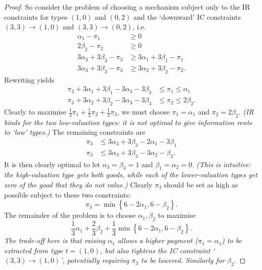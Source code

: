 \begin{proof}
	So consider the problem of choosing a mechanism subject only to the IR constraints for types $(1,0)$ and $(0,2)$
	and the `downward' IC constraints $(3,3) \to (1,0)$ and $(3,3) \to (0,2)$, i.e.
	\begin{align*}
		\alpha_1 - \pi_1
		&\geq 0 \\
		2 \beta_2 - \pi_2
		&\geq 0 \\
		3 \alpha_3 + 3 \beta_3 - \pi_3
		&\geq 3 \alpha_1 + 3 \beta_1 - \pi_1 \\
		3 \alpha_3 + 3 \beta_3 - \pi_3
		&\geq 3 \alpha_2 + 3 \beta_2 - \pi_2 .
	\end{align*}
	Rewriting yields
	\begin{align*}
		\pi_3 + 3 \alpha_1 + 3 \beta_1 - 3 \alpha_3 - 3 \beta_3
		&\leq \pi_1
		\leq \alpha_1
		\\
		\pi_3 + 3 \alpha_2 + 3 \beta_2 - 3 \alpha_3 - 3 \beta_3
		&\leq \pi_2
		\leq 2 \beta_2 .
	\end{align*}
	Clearly to maximise $\frac{1}{3}\pi_1 + \frac{1}{3}\pi_2 + \frac{1}{3}\pi_3$,
	we must choose $\pi_1 = \alpha_1$ and $\pi_2 = 2 \beta_2$.
	\emph{(IR binds for the two low-valuation types: it is not optimal to give information rents to `low' types.)}
	The remaining constraints are
	\begin{align*}
		\pi_3
		&\leq 3 \alpha_3 + 3 \beta_3 - 2 \alpha_1 - 3 \beta_1
		\\
		\pi_3
		&\leq 3 \alpha_3 + 3 \beta_3 - 3 \alpha_2 - \beta_2 .
	\end{align*}
	It is then clearly optimal to let $\alpha_3 = \beta_3 = 1$ and $\beta_1 = \alpha_2 = 0$.
	\emph{(This is intuitive: the high-valuation type gets both goods, while each of the lower-valuation types get zero of the good that they do not value.)}
	Clearly $\pi_3$ should be set as high as possible subject to these two constraints:
	\begin{equation*}
		\pi_3 = \min\left\{ 6 - 2 \alpha_1, 6 - \beta_2 \right\} .
	\end{equation*}
	The remainder of the problem is to choose $\alpha_1,\beta_2$ to maximise
	\begin{equation*}
		\frac{1}{3}\alpha_1 + \frac{2}{3}\beta_2
		+ \frac{1}{3}\min\left\{ 6 - 2 \alpha_1, 6 - \beta_2 \right\} .
	\end{equation*}
	\emph{The trade-off here is that
	raising $\alpha_1$ allows a higher payment ($\pi_1 = \alpha_1$) to be extracted from type $t=(1,0)$,
	but also tightens the IC constraint \textrm{`$(3,3) \to (1,0)$'}, potentially requiring $\pi_3$ to be lowered.
	Similarly for $\beta_2$.}
	

\end{proof}
